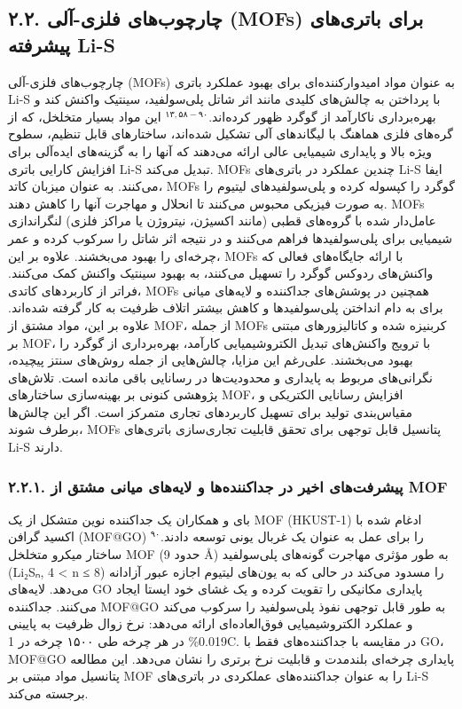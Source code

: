 \documentclass[12pt,a4paper,twocolumn]{article} %
\newcommand{\persian}[1]{\textfarsi{#1}}
\newcommand{\english}[1]{\textenglish{#1}}
\begin{document}
\subsection*{\persian{۲.۲. چارچوب‌های فلزی-آلی (\english{MOFs}) برای باتری‌های پیشرفته \english{Li-S}}}
\persian{
چارچوب‌های فلزی-آلی (\english{MOFs}) به عنوان مواد امیدوارکننده‌ای برای بهبود عملکرد باتری \english{Li-S} با پرداختن به چالش‌های کلیدی مانند اثر شاتل پلی‌سولفید، سینتیک واکنش کند و بهره‌برداری ناکارآمد از گوگرد ظهور کرده‌اند.$^{۱۳, ۵۸-۹۰}$ این مواد بسیار متخلخل، که از گره‌های فلزی هماهنگ با لیگاندهای آلی تشکیل شده‌اند، ساختارهای قابل تنظیم، سطوح ویژه بالا و پایداری شیمیایی عالی ارائه می‌دهند که آنها را به گزینه‌های ایده‌آلی برای افزایش کارایی باتری \english{Li-S} تبدیل می‌کند.
}
\persian{
\english{MOFs} چندین عملکرد در باتری‌های \english{Li-S} ایفا می‌کنند. به عنوان میزبان کاتد، \english{MOFs} گوگرد را کپسوله کرده و پلی‌سولفیدهای لیتیوم را به صورت فیزیکی محبوس می‌کنند تا انحلال و مهاجرت آنها را کاهش دهند. \english{MOFs} عامل‌دار شده با گروه‌های قطبی (مانند اکسیژن، نیتروژن یا مراکز فلزی) لنگراندازی شیمیایی برای پلی‌سولفیدها فراهم می‌کنند و در نتیجه اثر شاتل را سرکوب کرده و عمر چرخه‌ای را بهبود می‌بخشند. علاوه بر این، \english{MOFs} با ارائه جایگاه‌های فعالی که واکنش‌های ردوکس گوگرد را تسهیل می‌کنند، به بهبود سینتیک واکنش کمک می‌کنند. فراتر از کاربردهای کاتدی، \english{MOFs} همچنین در پوشش‌های جداکننده و لایه‌های میانی برای به دام انداختن پلی‌سولفیدها و کاهش بیشتر اتلاف ظرفیت به کار گرفته شده‌اند. علاوه بر این، مواد مشتق از \english{MOF}، از جمله \english{MOFs} کربنیزه شده و کاتالیزورهای مبتنی بر \english{MOF}، با ترویج واکنش‌های تبدیل الکتروشیمیایی کارآمد، بهره‌برداری از گوگرد را بهبود می‌بخشند.
}
\persian{
علی‌رغم این مزایا، چالش‌هایی از جمله روش‌های سنتز پیچیده، نگرانی‌های مربوط به پایداری و محدودیت‌ها در رسانایی باقی مانده است. تلاش‌های پژوهشی کنونی بر بهینه‌سازی ساختارهای \english{MOF}، افزایش رسانایی الکتریکی و مقیاس‌بندی تولید برای تسهیل کاربردهای تجاری متمرکز است. اگر این چالش‌ها برطرف شوند، \english{MOFs} پتانسیل قابل توجهی برای تحقق قابلیت تجاری‌سازی باتری‌های \english{Li-S} دارند.
}
\subsubsection*{\persian{۲.۲.۱. پیشرفت‌های اخیر در جداکننده‌ها و لایه‌های میانی مشتق از \english{MOF}}}
\persian{
بای و همکاران یک جداکننده نوین متشکل از یک \english{MOF} (\english{HKUST-1}) ادغام شده با اکسید گرافن (\english{MOF@GO}) را برای عمل به عنوان یک غربال یونی توسعه دادند.$^{۹۰}$ ساختار میکرو متخلخل \english{MOF} (حدود \english{9 Å}) به طور مؤثری مهاجرت گونه‌های پلی‌سولفید (\english{Li₂Sₙ, 4 < n ≤ 8}) را مسدود می‌کند در حالی که به یون‌های لیتیوم اجازه عبور آزادانه می‌دهد. لایه‌های \english{GO} پایداری مکانیکی را تقویت کرده و یک غشای خود ایستا ایجاد می‌کنند. جداکننده \english{MOF@GO} به طور قابل توجهی نفوذ پلی‌سولفید را سرکوب می‌کند و عملکرد الکتروشیمیایی فوق‌العاده‌ای ارائه می‌دهد: نرخ زوال ظرفیت به پایینی \english{0.019\%} در هر چرخه طی ۱۵۰۰ چرخه در \english{1C}. در مقایسه با جداکننده‌های فقط با \english{GO}، \english{MOF@GO} پایداری چرخه‌ای بلندمدت و قابلیت نرخ برتری را نشان می‌دهد. این مطالعه پتانسیل مواد مبتنی بر \english{MOF} را به عنوان جداکننده‌های عملکردی در باتری‌های \english{Li-S} برجسته می‌کند.
}
\end{document}
